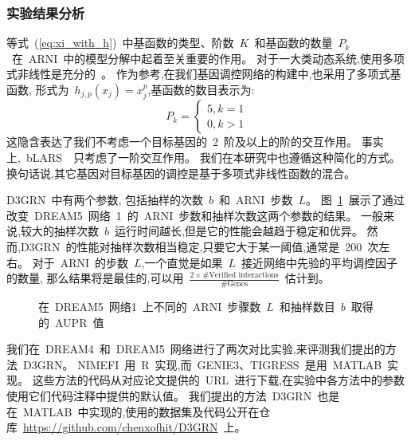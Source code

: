 \subsubsection{实验结果分析}

等式~(\ref{eq:xi_with_h})~中基函数的类型、阶数~$K$~和基函数的数量~$P_k$~在~ARNI~中的模型分解中起着至关重要的作用。
对于一大类动态系统,使用多项式非线性是充分的~\cite{mangan2016inferring}。
作为参考,在我们基因调控网络的构建中,也采用了多项式基函数,
形式为~$h_{j,p}(x_j)=x_j^p$,基函数的数目表示为: 
\begin{equation}
P_k=\left\{\begin{matrix}
5,  k=1\\ 
0,  k>1
\end{matrix}\right. 
\end{equation}
这隐含表达了我们不考虑一个目标基因的~2~阶及以上的阶的交互作用。
事实上,~bLARS~\cite{singh2016blars}~只考虑了一阶交互作用。
我们在本研究中也遵循这种简化的方式。
换句话说,其它基因对目标基因的调控是基于多项式非线性函数的混合。

D3GRN~中有两个参数,
包括抽样的次数~$b$~和~ARNI~步数~$L$。
图~\ref{fig:performance_dr5}~展示了通过改变~DREAM5~网络~1~的~ARNI~步数和抽样次数这两个参数的结果。
一般来说,较大的抽样次数~$b$~运行时间越长,但是它的性能会越趋于稳定和优异。
然而,D3GRN~的性能对抽样次数相当稳定,只要它大于某一阈值,通常是~200~次左右。
对于~ARNI~的步数~$L$,一个直觉是如果~$L$~接近网络中先验的平均调控因子的数量,
那么结果将是最佳的,可以用~$\frac{2  \times \#\text{Verified interactions}}{\#\text{Genes}}$~估计到。
 
\begin{figure}[!htbp]
\centering

\caption{
在~DREAM5~网络1~上不同的~ARNI~步骤数~$L$~和抽样数目~$b$~取得的~AUPR~值}

\label{fig:performance_dr5}
\end{figure}

我们在~DREAM4~和~DREAM5~网络进行了两次对比实验,来评测我们提出的方法~D3GRN。
NIMEFI~用~R~实现,而~GENIE3、TIGRESS~是用~MATLAB~实现。
这些方法的代码从对应论文提供的~URL~进行下载,在实验中各方法中的参数使用它们代码注释中提供的默认值。
我们提出的方法~D3GRN~也是在~MATLAB~中实现的,使用的数据集及代码公开在仓库~\url{https://github.com/chenxofhit/D3GRN}~上。

